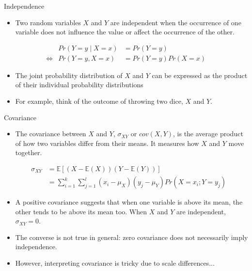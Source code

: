 \documentclass[notes,10pt, aspectratio=169]{beamer}
\begin{document}
\begin{frame}{Independence}
    \begin{itemize}
        \item Two random variables $X$ and $Y$ are independent when the occurrence of one variable does not influence the value or affect the occurrence of the other.\vspace{.3cm}
    \end{itemize}
    \begin{eqnarray*}
        & Pr(Y=y\mid X=x)&= Pr(Y=y)\\
        \Leftrightarrow & Pr(Y=y, X=x)&= Pr(Y=y)Pr(X=x)
    \end{eqnarray*}
    \begin{itemize}
        \item  The joint probability distribution of $X$ and $Y$ can be expressed as the product of their individual probability distributions\vspace{.3cm}
        \item For example, think of the outcome of throwing two dice, $X$ and $Y$. 
    \end{itemize}
\end{frame}

\begin{frame}{Covariance}
    \begin{itemize}
        \item The covariance between $X$ and $Y$, $\sigma_{XY}$ or $cov(X,Y)$, is the average product of how two variables differ from their means. It measures how $X$ and $Y$ move together. 
    \end{itemize}
\begin{eqnarray*}
    &\sigma_{XY} &= \mathbb{E}[(X-\mathbb{E}(X))(Y-\mathbb{E}(Y))]\\
    &  &=\sum^k_{i=1}\sum^l_{j=1} (x_i-\mu_X)(y_j-\mu_Y)Pr(X=x_i; Y=y_j)
\end{eqnarray*} 
 \begin{itemize}
     \item A positive covariance suggests that when one variable is above its mean, the other tends to be above its mean too. When $X$ and $Y$ are independent, $\sigma_{XY}=0$.\vspace{.2cm}
    \item The converse is not true in general: zero covariance does not necessarily imply independence.\vspace{.2cm}
    \item However, interpreting covariance is tricky due to scale differences... 
 \end{itemize}       
\end{frame}
\end{document}

